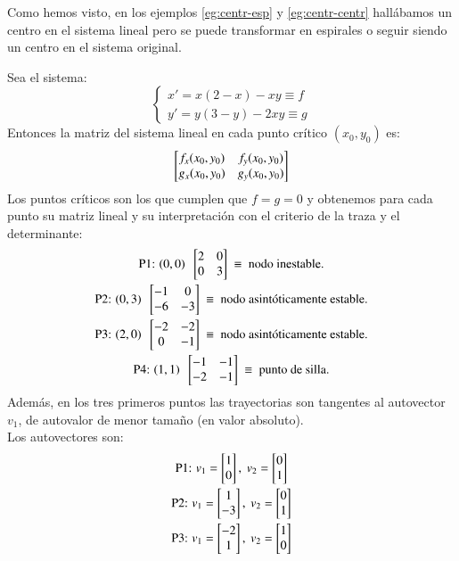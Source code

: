 \begin{obs}
    Como hemos visto, en los ejemplos \ref{eg:centr-esp} y \ref{eg:centr-centr} hallábamos un centro en el sistema lineal pero se puede transformar en espirales o seguir siendo un centro en el sistema original.
\end{obs}
\begin{eg}
    Sea el sistema:
    $$
        \begin{cases}
            x' = x(2-x) - xy \equiv f\\
            y' = y(3-y) -2xy \equiv g
        \end{cases}
    $$
    Entonces la matriz del sistema lineal en cada punto crítico $(x_0, y_0)$ es:
    $$
        \mx{f_x(x_0, y_0) & f_y(x_0, y_0)\\ g_x(x_0, y_0) & g_y(x_0, y_0)}
    $$
    Los puntos críticos son los que cumplen que $f = g = 0$ y obtenemos para cada punto su matriz lineal y su interpretación con el criterio de la traza y el determinante:
    \begin{gather*}
        \text{P1: }(0, 0)\ \ \mx{2 & 0 \\ 0 & 3}\ \equiv \text{ nodo inestable.}\\
        \text{P2: }(0, 3)\ \ \mx{-1 & 0 \\ -6 & -3}\ \equiv \text{ nodo asintóticamente estable.}\\
        \text{P3: }(2, 0)\ \ \mx{-2 & -2 \\ 0 & -1}\ \equiv \text{ nodo asintóticamente estable.}\\
        \text{P4: }(1, 1)\ \ \mx{-1 & -1 \\ -2 & -1}\ \equiv \text{ punto de silla.}\\
    \end{gather*}
    Además, en los tres primeros puntos las trayectorias son tangentes al autovector $v_1$, de autovalor de menor tamaño (en valor absoluto).\\
    Los autovectores son:
    \begin{gather*}
        \text{P1: } v_1 = \mx{1\\ 0},\ v_2 = \mx{0\\1}\\
        \text{P2: } v_1 = \mx{1\\ -3},\ v_2 = \mx{0\\1}\\
        \text{P3: } v_1 = \mx{-2\\ 1},\ v_2 = \mx{1\\0}\\

\end{gather*}
\end{eg}
